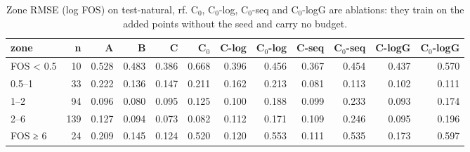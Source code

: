 \begin{table}[htbp]
\centering
\small
\setlength{\tabcolsep}{4pt}
\caption{Zone RMSE (log FOS) on test-natural, rf. C$_0$, C$_0$-log, C$_0$-seq and C$_0$-logG are ablations: they train on the added points without the seed and carry no budget.}
\label{tab:test-natural__log-rmse:zones_log:rf}
\begin{tabular}{lrrrrrrrrrrr}
\toprule
zone & n & A & B & C & C$_0$ & C-log & C$_0$-log & C-seq & C$_0$-seq & C-logG & C$_0$-logG \\
\midrule
FOS < 0.5 & 10 & 0.528 & 0.483 & 0.386 & 0.668 & 0.396 & 0.456 & 0.367 & 0.454 & 0.437 & 0.570 \\
0.5–1 & 33 & 0.222 & 0.136 & 0.147 & 0.211 & 0.162 & 0.213 & 0.081 & 0.113 & 0.102 & 0.111 \\
1–2 & 94 & 0.096 & 0.080 & 0.095 & 0.125 & 0.100 & 0.188 & 0.099 & 0.233 & 0.093 & 0.174 \\
2–6 & 139 & 0.127 & 0.094 & 0.073 & 0.082 & 0.112 & 0.171 & 0.109 & 0.246 & 0.095 & 0.196 \\
FOS ≥ 6 & 24 & 0.209 & 0.145 & 0.124 & 0.520 & 0.120 & 0.553 & 0.111 & 0.535 & 0.173 & 0.597 \\
\bottomrule
\end{tabular}
\end{table}
